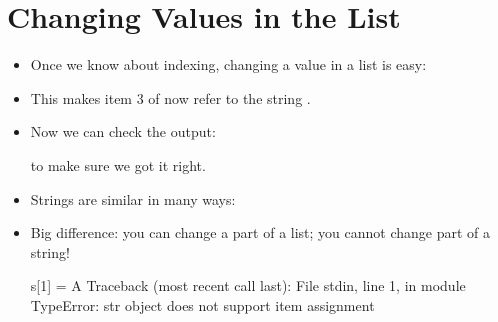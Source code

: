 \documentclass[letterpaper,10pt,english]{sphinxmanual}
\begin{document}
\section{Changing Values in the List}
\label{\detokenize{lecture_notes/lec08_lists1:changing-values-in-the-list}}\begin{itemize}
\item {} 
Once we know about indexing, changing a value in a list is easy:

\begin{sphinxVerbatim}[commandchars=\\\{\}]
\PYG{p}{[}\PYG{p}{]}  
\end{sphinxVerbatim}

\item {} 
This makes item 3 of  now refer to the string .

\item {} 
Now we can check the output:

\begin{sphinxVerbatim}[commandchars=\\\{\}]
\end{sphinxVerbatim}

to make sure we got it right.

\item {} 
Strings are similar in many ways:

\begin{sphinxVerbatim}[commandchars=\\\{\}]
  
\PYG{p}{[}\PYG{p}{]}
\PYG{p}{[}\PYG{p}{]}
\end{sphinxVerbatim}

\item {} 
Big difference: you can change a part of a list; you cannot
change part of a string!

\begin{sphinxVerbatim}[commandchars=\\\{\}]
\PYGZgt{}\PYGZgt{}\PYGZgt{} s[1] = \PYGZsq{}A\PYGZsq{}
Traceback (most recent call last):
File \PYGZdq{}\PYGZlt{}stdin\PYGZgt{}\PYGZdq{}, line 1, in \PYGZlt{}module\PYGZgt{}
TypeError: \PYGZsq{}str\PYGZsq{} object does not support item assignment
\end{sphinxVerbatim}

\end{itemize}
\end{document}
